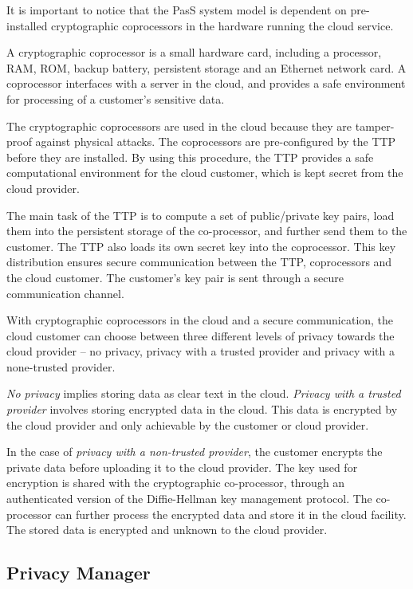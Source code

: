 \documentclass[pdftex,english,10pt,b5paper,twoside]{book}
\begin{document}
It is important to notice that the \ac{PasS} system model is dependent on
pre-installed cryptographic coprocessors in the hardware running the cloud
service.

A cryptographic coprocessor is a small hardware card, including a processor,
\ac{RAM}, \ac{ROM}, backup battery, persistent storage and an Ethernet network
card. A coprocessor interfaces with a server in the cloud, and provides a safe
environment for processing of a customer's sensitive data.

The cryptographic coprocessors are used in the cloud because they are
tamper-proof against physical attacks. The coprocessors are pre-configured by
the \ac{TTP} before they are installed. By using this procedure, the \ac{TTP}
provides a safe computational environment for the cloud customer, which is kept
secret from the cloud provider.

The main task of the \ac{TTP} is to compute a set of public/private key pairs,
load them into the persistent storage of the co-processor, and further send
them to the customer. The \ac{TTP} also loads its own secret key into the
coprocessor. This key distribution ensures secure communication between the
\ac{TTP}, coprocessors and the cloud customer. The customer's key pair is sent
through a secure communication channel.

With cryptographic coprocessors in the cloud and a secure communication, the
cloud customer can choose between three different levels of privacy towards the
cloud provider -- no privacy, privacy with a trusted provider and privacy with
a none-trusted provider.

\emph{No privacy} implies storing data as clear text in the cloud.
\emph{Privacy with a trusted provider} involves storing encrypted data in the
cloud. This data is encrypted by the cloud provider and only achievable by the
customer or cloud provider.

In the case of \emph{privacy with a non-trusted provider}, the customer
encrypts the private data before uploading it to the cloud provider. The key
used for encryption is shared with the cryptographic co-processor, through an
authenticated version of the Diffie-Hellman key management protocol. The
co-processor can further process the encrypted data and store it in the cloud
facility. The stored data is encrypted and unknown to the cloud provider.

\subsection{Privacy Manager}
\end{document}
